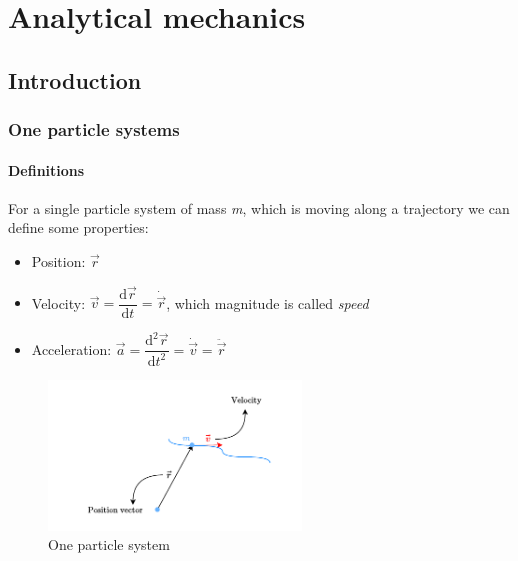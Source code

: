 \part{Analytical mechanics}
\chapter{Introduction}
\section{One particle systems}
\subsection{Definitions}
For a single particle system of mass \textit{m}, which is moving along a trajectory we can define some properties:
\begin{itemize}
    \item Position: $\vec{r}$
    \item Velocity: $\vec{v} = \dfrac{\mathrm{d} \vec{r}}{\mathrm{d} t}=\dot{\vec{r}}$, which magnitude is called \textit{speed}
    \item Acceleration: $\vec{a}=\dfrac{\mathrm{d}^2 \vec{r}}{\mathrm{d} t^2}=\dot{\vec{v}}=\ddot{\vec{r}}$
\end{itemize}
\begin{figure}[H]
    \centering
    \includegraphics[width=0.6\textwidth]{res/svg/onepartsys.drawio}
    \caption{One particle system}
    \label{fig:image1}
\end{figure}

